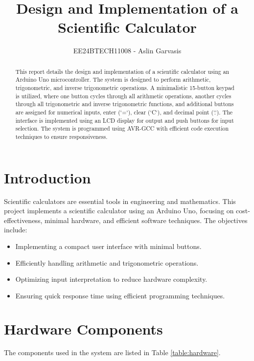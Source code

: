 \documentclass[journal]{IEEEtran}
\begin{document}
\title{Design and Implementation of a Scientific Calculator}
\author{EE24BTECH11008 - Aslin Garvasis}
\maketitle

\begin{abstract}
This report details the design and implementation of a scientific calculator using an Arduino Uno microcontroller. The system is designed to perform arithmetic, trigonometric, and inverse trigonometric operations. A minimalistic 15-button keypad is utilized, where one button cycles through all arithmetic operations, another cycles through all trigonometric and inverse trigonometric functions, and additional buttons are assigned for numerical inputs, enter (`=`), clear (`C`), and decimal point (`.`). The interface is implemented using an LCD display for output and push buttons for input selection. The system is programmed using AVR-GCC with efficient code execution techniques to ensure responsiveness.
\end{abstract}

\section{Introduction}
Scientific calculators are essential tools in engineering and mathematics. This project implements a scientific calculator using an Arduino Uno, focusing on cost-effectiveness, minimal hardware, and efficient software techniques. The objectives include:
\begin{itemize}
    \item Implementing a compact user interface with minimal buttons.
    \item Efficiently handling arithmetic and trigonometric operations.
    \item Optimizing input interpretation to reduce hardware complexity.
    \item Ensuring quick response time using efficient programming techniques.
\end{itemize}

\section{Hardware Components}
The components used in the system are listed in Table \ref{table:hardware}.
\end{document}
